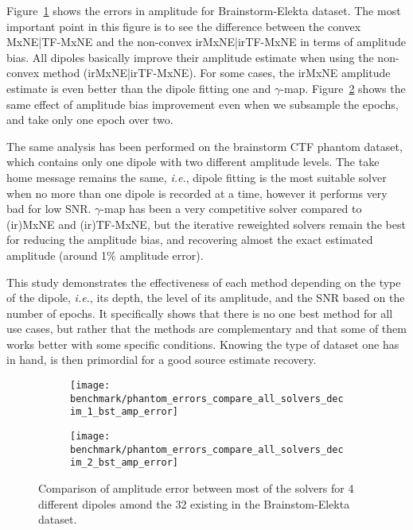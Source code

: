 Figure~\ref{fig:all_solvers_amp_error_bst} shows the errors in amplitude for Brainstorm-Elekta dataset. The most important point in this figure is to see the difference between the convex MxNE|TF-MxNE and the non-convex irMxNE|irTF-MxNE in terms of amplitude bias. All dipoles basically improve their amplitude estimate when using the non-convex method (irMxNE|irTF-MxNE). For some cases, the irMxNE amplitude estimate is even better than the dipole fitting one and $\gamma$-map. Figure~\ref{fig:all_solvers_amp_error_decim_2_bst} shows the same effect of amplitude bias improvement even when we subsample the epochs, and take only one epoch over two.

The same analysis has been performed on the brainstorm CTF phantom dataset, which contains only one dipole with two different amplitude levels. The take home message remains the same, \textit{i.e.}, dipole fitting is the most suitable solver when no more than one dipole is recorded at a time, however it performs very bad for low SNR. $\gamma$-map has been a very competitive solver compared to (ir)MxNE and (ir)TF-MxNE, but the iterative reweighted solvers remain the best for reducing the amplitude bias, and recovering almost the exact estimated amplitude (around 1\% amplitude error).

This study demonstrates the effectiveness of each method depending on the type of the dipole, \textit{i.e.}, its depth, the level of its amplitude, and the SNR based on the number of epochs. It specifically shows that there is no one best method for all use cases, but rather that the methods are complementary and that some of them works better with some specific conditions. Knowing the type of dataset one has in hand, is then primordial for a good source estimate recovery.

\begin{figure}[p]
	\centering
    \begin{subfigure}{0.9\linewidth}
		\centering
		\texttt{[image: benchmark/phantom\_errors\_compare\_all\_solvers\_decim\_1\_bst\_amp\_error]}
	    \caption{\label{fig:all_solvers_amp_error_bst}}
    \end{subfigure}
	\hspace{5cm}
	\hfill
    \begin{subfigure}{0.9\linewidth}  
		\centering 
		\texttt{[image: benchmark/phantom\_errors\_compare\_all\_solvers\_decim\_2\_bst\_amp\_error]}
		\caption{\label{fig:all_solvers_amp_error_decim_2_bst}}
	\end{subfigure}

		\caption{Comparison of amplitude error between most of the solvers for 4 different dipoles amond the 32 existing in the Brainstom-Elekta dataset. \label{all_solvers_amp_error_bst}}
\end{figure}

